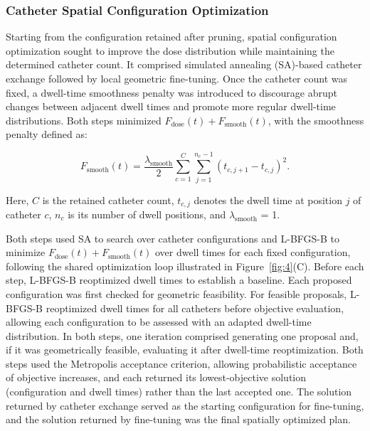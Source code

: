 \documentclass[12pt,twoside,letterpaper]{article}
\begin{document}
\subsubsection{Catheter Spatial Configuration Optimization}\label{sec:2-2-3}

Starting from the configuration retained after pruning, spatial configuration optimization sought to improve the dose distribution while maintaining the determined catheter count. It comprised simulated annealing (SA)-based catheter exchange followed by local geometric fine-tuning. Once the catheter count was fixed, a dwell-time smoothness penalty was introduced to discourage abrupt changes between adjacent dwell times and promote more regular dwell-time distributions. Both steps minimized $F_{\text{dose}}\left( t \right) + F_{\text{smooth}}\left( t \right)$, with the smoothness penalty defined as:

\begin{equation}\label{eq:7}
F_{\text{smooth}}\left( t \right) = \frac{\lambda_{\text{smooth}}}{2}\sum_{c = 1}^{C}{\sum_{j = 1}^{n_{c} - 1}\left( t_{c,j + 1} - t_{c,j} \right)^{2}}.
\end{equation}

Here, $C$ is the retained catheter count, $t_{c,j}$ denotes the dwell time at position $j$ of catheter $c$, $n_{c}$ is its number of dwell positions, and $\lambda_{\text{smooth}}$ = 1.

Both steps used SA to search over catheter configurations and L-BFGS-B to minimize $F_{\text{dose}}\left( t \right) + F_{\text{smooth}}\left( t \right)$ over dwell times for each fixed configuration, following the shared optimization loop illustrated in Figure~\ref{fig:4}(C). Before each step, L-BFGS-B reoptimized dwell times to establish a baseline. Each proposed configuration was first checked for geometric feasibility. For feasible proposals, L-BFGS-B reoptimized dwell times for all catheters before objective evaluation, allowing each configuration to be assessed with an adapted dwell-time distribution. In both steps, one iteration comprised generating one proposal and, if it was geometrically feasible, evaluating it after dwell-time reoptimization. Both steps used the Metropolis acceptance criterion,\cite{ref78} allowing probabilistic acceptance of objective increases, and each returned its lowest-objective solution (configuration and dwell times) rather than the last accepted one. The solution returned by catheter exchange served as the starting configuration for fine-tuning, and the solution returned by fine-tuning was the final spatially optimized plan.
\end{document}
